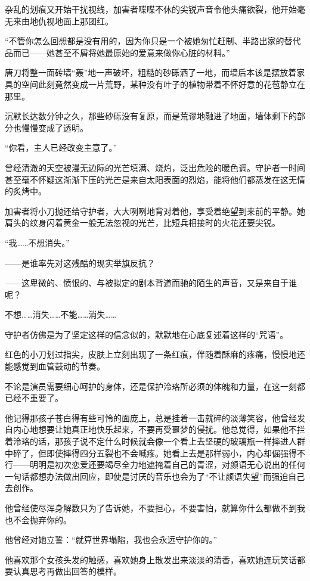 \documentclass[UTF8, scheme = chinese, openany]{ctexbook}
\begin{document}
杂乱的划痕又开始干扰视线，加害者喋喋不休的尖锐声音令他头痛欲裂，他开始毫无来由地仇视地面上那团红。

“不管你怎么回想都是没有用的，因为你只是一个被她匆忙赶制、半路出家的替代品而已——她甚至不屑将她最原始的爱意来做你心脏的材料。”

唐刀将整一面砖墙“轰”地一声破坏，粗糙的砂砾洒了一地，而墙后本该是摆放着家具的空间此刻竟然变成一片荒野，某种没有叶子的植物带着不怀好意的花苞静立在那里。

沉默长达数分钟之久，那些砂砾没有复原，而是荒谬地融进了地面，墙体剩下的部分也慢慢变成了透明。

“你看，主人已经改变主意了。”

曾经清澈的天空被漫无边际的光芒填满、烧灼，泛出危险的暖色调。守护者一时间甚至毫不怀疑这渐渐下压的光芒是来自太阳表面的烈焰，能将他们都蒸发在这无情的炙烤中。

加害者将小刀抛还给守护者，大大咧咧地背对着他，享受着绝望到来前的平静。她肩头的纹身闪着黄金一般无法忽视的光芒，比短兵相接时的火花还要尖锐。

“我……不想消失。”

——是谁率先对这残酷的现实举旗反抗？

——这卑微的、愤恨的、与被拟定的剧本背道而驰的陌生的声音，又是来自于谁呢？

\vspace{1.5em}

不想……消失……不能……消失……

守护者仿佛是为了坚定这样的信念似的，默默地在心底复述着这样的“咒语”。

红色的小刀划过指尖，皮肤上立刻出现了一条红痕，伴随着酥麻的疼痛，慢慢地还能感觉到血管鼓动的节奏。

不论是演员需要细心呵护的身体，还是保护泠珞所必须的体魄和力量，在这一刻都已经不重要了。

他记得那孩子苍白得有些可怜的面庞上，总是挂着一击就碎的淡薄笑容，他曾经发自内心地想要让她真正地快乐起来，不要再受噩梦的侵扰。他总觉得，如果他不拦着泠珞的话，那孩子说不定什么时候就会像一个看上去坚硬的玻璃瓶一样摔进人群中碎了，但即使摔得四分五裂也不会喊疼。她看上去是那样弱小，内心却倔强得不行——明明是初次恋爱还要竭尽全力地遮掩着自己的青涩，对颜语无心说出的任何一句话都想办法做出回应，即使是讨厌的音乐也会为了“不让颜语失望”而强迫自己去创作。

他曾经使尽浑身解数只为了告诉她，不要担心，不要害怕，就算你什么都做不到我也不会抛弃你的。

他曾经对她立誓：“就算世界塌陷，我也会永远守护你的。”

他喜欢那个女孩头发的触感，喜欢她身上散发出来淡淡的清香，喜欢她连玩笑话都要认真思考再做出回答的模样。
\end{document}
